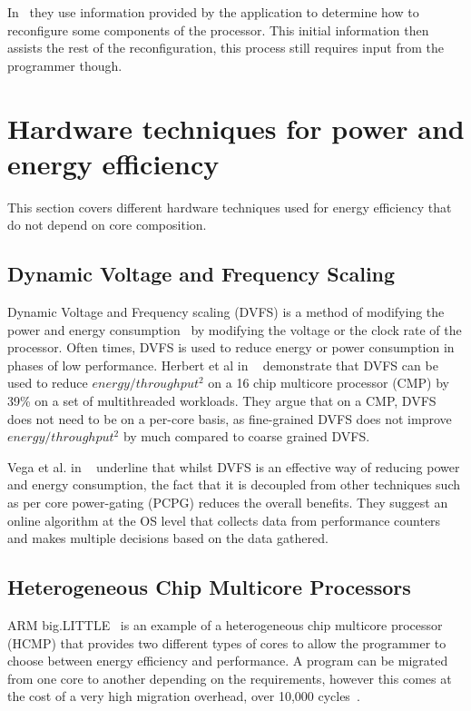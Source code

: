 In~\cite{santos2013nocdmc} they use information provided by the application to determine how to reconfigure some components of the processor.
This initial information then assists the rest of the reconfiguration, this process still requires input from the programmer though.

\section{Hardware techniques for power and energy efficiency}

This section covers different hardware techniques used for energy efficiency that do not depend on core composition.

\subsection{Dynamic Voltage and Frequency Scaling}
Dynamic Voltage and Frequency scaling (DVFS) is a method of modifying the power and energy consumption~\cite{paganiEECHM2017} by modifying the voltage or the clock rate of the processor.
Often times, DVFS is used to reduce energy or power consumption in phases of low performance.
Herbert et al in ~\cite{herbertDVFS07} demonstrate that DVFS can be used to reduce $energy/throughput^2$ on a 16 chip multicore processor (CMP) by 39\% on a set of multithreaded workloads.
They argue that on a CMP, DVFS does not need to be on a per-core basis, as fine-grained DVFS does not improve $energy/throughput^2$ by much compared to coarse grained DVFS.

Vega et al. in ~\cite{vega2013crank} underline that whilst DVFS is an effective way of reducing power and energy consumption, the fact that it is decoupled from other techniques such as per core power-gating (PCPG) reduces the overall benefits.
They suggest an online algorithm at the OS level that collects data from performance counters and makes multiple decisions based on the data gathered.


\subsection{Heterogeneous Chip Multicore Processors}
ARM big.LITTLE~\cite{} is an example of a heterogeneous chip multicore processor (HCMP) that provides two different types of cores to allow the programmer to choose between energy efficiency and performance.
A program can be migrated from one core to another depending on the requirements, however this comes at the cost of a very high migration overhead, over 10,000 cycles~\cite{}.

